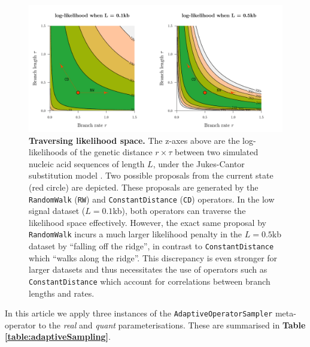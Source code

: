 \documentclass[10pt,letterpaper]{article}
\begin{document}
\begin{figure}[!h]
\includegraphics[width=\textwidth]{Figures/correlations.pdf}
\caption{\textbf{Traversing likelihood space.}
The z-axes above are the log-likelihoods of the genetic distance $r \times \tau$ between two simulated nucleic acid sequences of length $L$, under the Jukes-Cantor substitution model \cite{jukes1969evolution}. 
Two possible proposals from the current state (red circle) are depicted.
These proposals are generated by the \texttt{RandomWalk} (\texttt{RW}) and \texttt{ConstantDistance} (\texttt{CD}) operators.
In the low signal dataset ($L=0.1$kb), both operators can traverse the likelihood space effectively.
 However, the exact same proposal by \texttt{RandomWalk} incurs a much larger likelihood penalty in the $L=0.5$kb dataset by ``falling off the ridge'', in contrast to \texttt{ConstantDistance} which ``walks along the ridge''.
 This discrepancy is even stronger for larger datasets and thus necessitates the use of operators such as \texttt{ConstantDistance} which account for correlations between branch lengths and rates. }
\label{fig:rateparams}
\end{figure}


In this article we apply three instances of the \texttt{AdaptiveOperatorSampler} meta-operator to the \textit{real} and \textit{quant} parameterisations. 
These are summarised in \textbf{Table \ref{table:adaptiveSampling}}.
\end{document}

